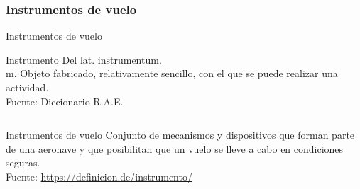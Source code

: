 
\subsubsection{Instrumentos de vuelo}
\label{sec:instrumentos.de.vuelo}


\begin{frame}{Instrumentos de vuelo}

  \begin{block}{Instrumento}
    Del lat. instrumentum.\\
    m. Objeto fabricado, relativamente sencillo, con el que se puede realizar una actividad.\\
   {\tiny Fuente: Diccionario R.A.E.}
  \end{block}

  \begin{columns}{2}

    \begin{column}{0.5\textwidth}

{\small


  \begin{block}{Instrumentos de vuelo}
	Conjunto de mecanismos y dispositivos que forman parte de una aeronave y 
	que posibilitan que un vuelo se lleve a cabo en condiciones seguras.\\
	{\tiny Fuente: \url{https://definicion.de/instrumento/}}
  \end{block}


}
\end{column}
\end{columns}
\end{frame}
